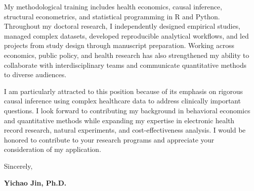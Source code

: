 \documentclass[11pt, letterpaper]{article}
\begin{document}
My methodological training includes health economics, causal inference, structural econometrics, and statistical programming in R and Python. Throughout my doctoral research, I independently designed empirical studies, managed complex datasets, developed reproducible analytical workflows, and led projects from study design through manuscript preparation. Working across economics, public policy, and health research has also strengthened my ability to collaborate with interdisciplinary teams and communicate quantitative methods to diverse audiences.

I am particularly attracted to this position because of its emphasis on rigorous causal inference using complex healthcare data to address clinically important questions. I look forward to contributing my background in behavioral economics and quantitative methods while expanding my expertise in electronic health record research, natural experiments, and cost-effectiveness analysis. I would be honored to contribute to your research programs and appreciate your consideration of my application.

\vspace{0.5em}

Sincerely,

\vspace{1em}

\textbf{Yichao Jin, Ph.D.}
\end{document}
